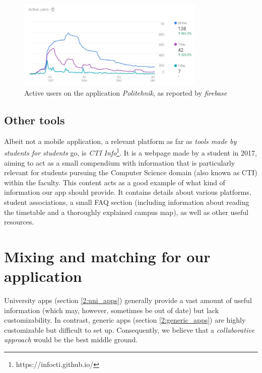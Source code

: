     \begin{figure}[ht]
        \centering
             \includegraphics[width=0.8\textwidth]{figures/charts/politehnik_usage.png}
        \caption{Active users on the application \textit{Politehnik}, as reported by \textit{\gls{firebase}}}
        \label{2:fig:politehnik_usage}
    \end{figure}
    
    \subsection{Other tools} \label{2:existing_apps_other}
    Albeit not a mobile application, a relevant platform as far as \textit{tools made by students for students} go, is \textit{CTI Info}\footnote{https://infocti.github.io/}. It is a webpage made by a student in 2017, aiming to act as a small compendium with information that is particularly relevant for students pursuing the Computer Science domain (also known as CTI) within the faculty. This content acts as a good example of what kind of information our app should provide. It contains details about various platforms, student associations, a small FAQ section (including information about reading the timetable and a thoroughly explained campus map), as well as other useful resources.

\section{Mixing and matching for our application} \label{2:mix_and_match}

    University apps (section \ref{2:uni_apps}) generally provide a vast amount of useful information (which may, however, sometimes be out of date) but lack customizability. In contrast, generic apps (section \ref{2:generic_apps}) are highly customizable but difficult to set up. Consequently, we believe that a \textit{collaborative approach} would be the best middle ground.
    
